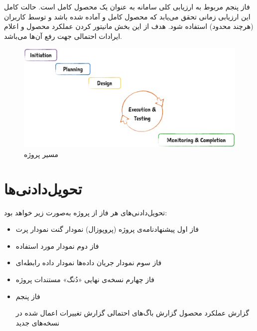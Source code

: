 فاز پنجم مربوط به ارزیابی کلی سامانه به عنوان یک محصول کامل است. حالت کامل این ارزیابی زمانی تحقق می‌یابد که محصول کامل و آماده شده باشد و توسط کاربران (هرچند محدود) استفاده شود.
هدف از این بخش مانیتور کردن عملکرد محصول و اعلام ایرادات احتمالی جهت رفع آن‌ها می‌باشد.

\begin{figure}[h]
	\centering\includegraphics[scale=0.25]{proj_phases}
	\caption{مسیر پروژه}
	\label{phases} %
\end{figure}

\pagebreak
\section{تحویل‌دادنی‌ها}
تحویل‌دادنی‌های هر فاز از پروژه به‌صورت زیر خواهد بود:

\begin{itemize}
	\item 
	فاز اول
	\subitem
	پیشنهادنامه‌ی پروژه (پروپوزال)
	\subitem نمودار گنت 
	\subitem نمودار پرت 
	\item 
	فاز دوم
	\subitem  نمودار مورد استفاده

	
	\item 
	فاز سوم
	\subitem نمودار جریان داده‌ها 
	\subitem
	نمودار داده رابطه‌ای
	
	\item 
فاز چهارم
	\subitem نسخه‌ی نهایی «دُنگ‌»
	\subitem مستندات پروژه
	
	\item 
	فاز پنجم
	
	\subitem گزارش عملکرد محصول
	\subitem گزارش باگ‌های احتمالی
	\subitem گزارش تغییرات اعمال شده در نسخه‌های جدید
\end{itemize}